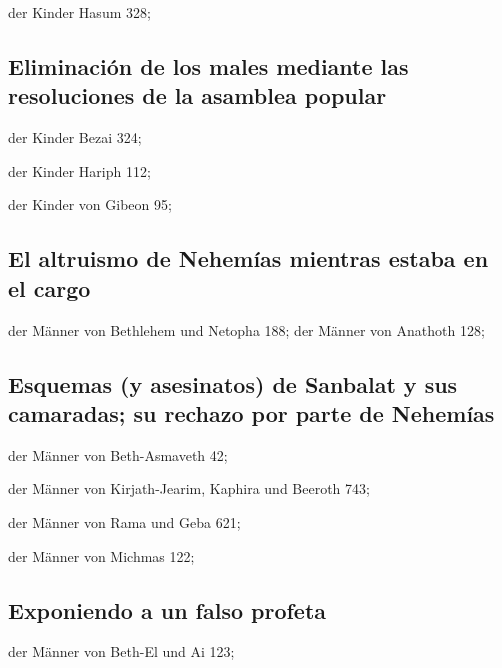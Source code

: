  der Kinder Hasum 328;

\hypertarget{eliminaciuxf3n-de-los-males-mediante-las-resoluciones-de-la-asamblea-popular}{%
\subsection{Eliminación de los males mediante las resoluciones de la
asamblea
popular}\label{eliminaciuxf3n-de-los-males-mediante-las-resoluciones-de-la-asamblea-popular}}

 der Kinder Bezai 324;

 der Kinder Hariph 112;

 der Kinder von Gibeon 95;

\hypertarget{el-altruismo-de-nehemuxedas-mientras-estaba-en-el-cargo}{%
\subsection{El altruismo de Nehemías mientras estaba en el
cargo}\label{el-altruismo-de-nehemuxedas-mientras-estaba-en-el-cargo}}

 der Männer von Bethlehem und Netopha 188;
 der Männer von Anathoth 128;

\hypertarget{esquemas-y-asesinatos-de-sanbalat-y-sus-camaradas-su-rechazo-por-parte-de-nehemuxedas}{%
\subsection{Esquemas (y asesinatos) de Sanbalat y sus camaradas; su
rechazo por parte de
Nehemías}\label{esquemas-y-asesinatos-de-sanbalat-y-sus-camaradas-su-rechazo-por-parte-de-nehemuxedas}}

 der Männer von Beth-Asmaveth 42;

 der Männer von Kirjath-Jearim, Kaphira und Beeroth 743;

 der Männer von Rama und Geba 621;

 der Männer von Michmas 122;

\hypertarget{exponiendo-a-un-falso-profeta}{%
\subsection{Exponiendo a un falso
profeta}\label{exponiendo-a-un-falso-profeta}}

 der Männer von Beth-El und Ai 123;

